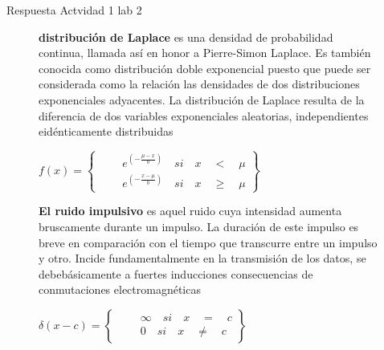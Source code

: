 \begin{frame}{Respuesta Actvidad 1 lab 2}
\begin{figure}[H]
\begin{flushleft}
\textbf{distribución de Laplace} es una densidad de probabilidad continua, llamada así en honor a Pierre-Simon Laplace. Es también conocida como distribución doble exponencial puesto que puede ser considerada como la relación las densidades de dos distribuciones exponenciales adyacentes. La distribución de Laplace resulta de la diferencia de dos variables exponenciales aleatorias, independientes eidénticamente distribuidas
\end{flushleft}
$f(x)=\left\{ \quad \quad \begin{matrix} { e }^{ \left( -\frac { \mu -x }{ b }  \right)  }\quad si\quad x\quad <\quad \mu  \\ { e }^{ \left( -\frac { x-\mu  }{ b }  \right)  }\quad si\quad x\quad \ge \quad \mu  \end{matrix} \right\} $
\begin{flushleft}
\textbf{El ruido impulsivo} es aquel ruido cuya intensidad aumenta bruscamente durante un impulso. La duración de este impulso es breve en comparación con  el tiempo que transcurre entre un impulso y otro. Incide fundamentalmente en la transmisión de los datos, se debebásicamente a fuertes inducciones 
consecuencias de conmutaciones electromagnéticas
\end{flushleft}
$\delta (x-c)=\left\{ \quad \quad \begin{matrix} \infty \quad si\quad x\quad =\quad c \\ 0\quad si\quad x\quad \neq \quad c \end{matrix} \right\} $

\end{figure}
\end{frame}
